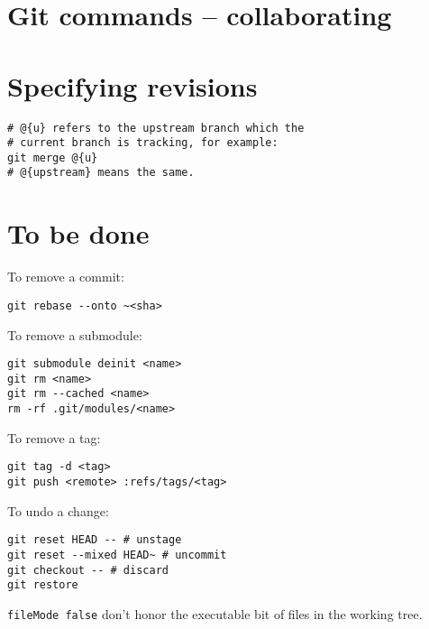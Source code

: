 \documentclass{charun}
\begin{document}
\section{Git commands -- collaborating}





\section{Specifying revisions}
\begin{verbatim}
# @{u} refers to the upstream branch which the
# current branch is tracking, for example:
git merge @{u}
# @{upstream} means the same.
\end{verbatim}

\section{To be done}
To remove a commit:
\begin{verbatim}
git rebase --onto ~<sha>
\end{verbatim}

To remove a submodule:
\begin{verbatim}
git submodule deinit <name>
git rm <name>
git rm --cached <name>
rm -rf .git/modules/<name>
\end{verbatim}

To remove a tag:
\begin{verbatim}
git tag -d <tag>
git push <remote> :refs/tags/<tag>
\end{verbatim}

To undo a change:
\begin{verbatim}
git reset HEAD -- # unstage
git reset --mixed HEAD~ # uncommit
git checkout -- # discard
git restore
\end{verbatim}


\texttt{fileMode false} don't honor the executable bit of files in the working tree.
\end{document}
